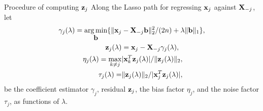 \begin{frame}
\begin{block}{Procedure of computing $\mbox{\bf z}_{j}$}
    Along the Lasso path for regressing $\mbox{\bf x}_j$ against $\mbox{\bf X}_{-j}$, let
\begin{equation}
\begin{aligned}
\gamma_j(\lambda) = \mathop{\arg\min}_{\mbox{\bf b}} \{\|\mbox{\bf x}_j & -\mbox{\bf X}_{-j}\mbox{\bf b}\|_2^2/(2n) + \lambda\|\mbox{\bf b}\|_1\}, \\
\mbox{\bf z}_j(\lambda)  & = \mbox{\bf x}_j-\mbox{\bf X}_{-j}\gamma_j(\lambda), \\
\eta_j(\lambda) = \max_{k\neq j} & |\mbox{\bf x}_k^T\mbox{\bf z}_j(\lambda)|/\|\mbox{\bf z}_j(\lambda)\|_2, \\
\tau_j(\lambda)  = & \|\mbox{\bf z}_j(\lambda)\|_2/|\mbox{\bf x}_j^T\mbox{\bf z}_j(\lambda)|, \\
\end{aligned}
\end{equation}
be the coefficient estimator $\gamma_j$, residual $\mbox{\bf z}_j$, the bias factor $\eta_j$, and
the noise factor $\tau_j$, as functions of $\lambda$.
\end{block}

\end{frame}


